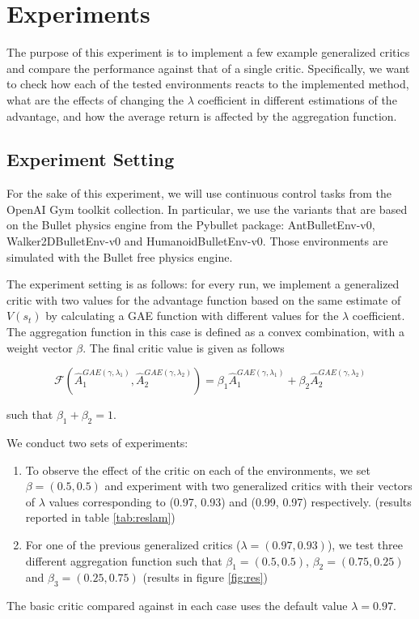\section{Experiments}
\label{sec:exp}

The purpose of this experiment is to implement a few example generalized critics and compare the performance against that of a single critic. Specifically, we want to check how each of the tested environments reacts to the implemented method, what are the effects of changing the $\lambda$ coefficient in different estimations of the advantage, and how the average return is affected by the aggregation function.

\subsection{Experiment Setting}
For the sake of this experiment, we will use continuous control tasks from the OpenAI Gym \cite{brockman2016openai} toolkit collection. In particular, we use the variants that are based on the Bullet physics engine from the Pybullet \cite{coumans2019pybullet} package: AntBulletEnv-v0, Walker2DBulletEnv-v0 and HumanoidBulletEnv-v0. Those environments are simulated with the Bullet free physics engine.

The experiment setting is as follows: for every run, we implement a generalized critic with two values for the advantage function based on the same estimate of $V(s_t)$ by calculating a GAE function with different values for the $\lambda$ coefficient. The aggregation function in this case is defined as a convex combination, with a weight vector $\beta$. The final critic value is given as follows

\[ \mathcal{F}(\hat{A}_1^{GAE(\gamma, \lambda_1)}, \hat{A}_2^{GAE(\gamma, \lambda_2)}) = \beta_1\hat{A}_1^{GAE(\gamma, \lambda_1)}+\beta_2\hat{A}_2^{GAE(\gamma, \lambda_2)} \]

such that $\beta_1 + \beta_2 = 1$.

We conduct two sets of experiments: 
\begin{enumerate}
\item To observe the effect of the critic on each of the environments, we set $\beta=(0.5, 0.5)$ and experiment with two generalized critics with their vectors of $\lambda$ values corresponding to (0.97, 0.93) and (0.99, 0.97) respectively. (results reported in table \ref{tab:reslam})
\item For one of the previous generalized critics ($\lambda = (0.97, 0.93)$), we test three different aggregation function such that $\beta_1 = (0.5, 0.5)$, $\beta_2 = (0.75, 0.25)$ and $\beta_3 = (0.25, 0.75)$ (results in figure \ref{fig:res})
\end{enumerate}
The basic critic compared against in each case uses the default value $\lambda = 0.97$.


